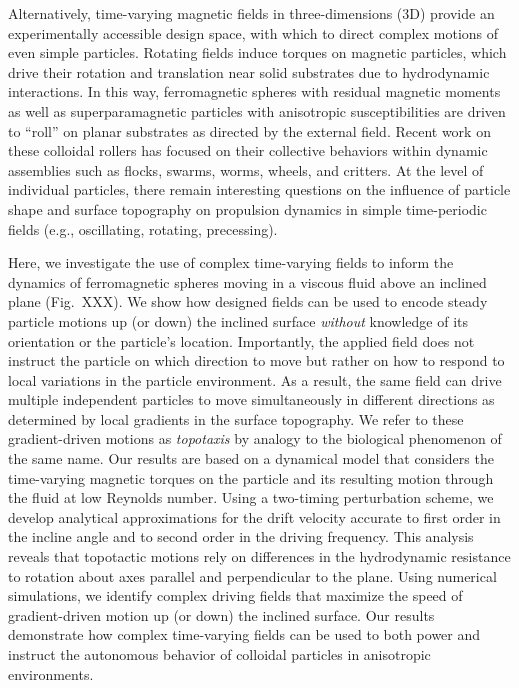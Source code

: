 Alternatively, time-varying magnetic fields in three-dimensions (3D) provide an experimentally accessible design space, with which to direct complex motions of even simple particles. Rotating fields induce torques on magnetic particles,\cite{Janssen2009} which drive their rotation and translation near solid substrates due to hydrodynamic interactions.\cite{Swan2007} In this way, ferromagnetic spheres with residual magnetic moments\cite{Driscoll2017} as well as superparamagnetic particles with anisotropic susceptibilities\cite{Tierno2008} are driven to “roll” on planar substrates as directed by the external field. Recent work on these colloidal rollers has focused on their collective behaviors within dynamic assemblies such as flocks,\cite{Kaiser2017} swarms,\cite{Xie2019} worms,\cite{Martinez-Pedrero2015} wheels,\cite{Tasci2016} and critters.\cite{Driscoll2017} At the level of individual particles, there remain interesting questions on the influence of particle shape\cite{Zhang2010} and surface topography\cite{Yang2019} on propulsion dynamics in simple time-periodic fields (e.g., oscillating, rotating, precessing).
 
Here, we investigate the use of complex time-varying fields to inform the dynamics of ferromagnetic spheres moving in a viscous fluid above an inclined plane (Fig.~XXX). We show how designed fields can be used to encode steady particle motions up (or down) the inclined surface \emph{without} knowledge of its orientation or the particle’s location. Importantly, the applied field does not instruct the particle on which direction to move but rather on how to respond to local variations in the particle environment. As a result, the same field can drive multiple independent particles to move simultaneously in different directions as determined by local gradients in the surface topography.  We refer to these gradient-driven motions as \emph{topotaxis} by analogy to the biological phenomenon of the same name.\cite{Park2018} Our results are based on a dynamical model that considers the time-varying magnetic torques on the particle and its resulting motion through the fluid at low Reynolds number. Using a two-timing perturbation scheme, we develop analytical approximations for the drift velocity accurate to first order in the incline angle and to second order in the driving frequency.   This analysis reveals that topotactic motions rely on differences in the hydrodynamic resistance to rotation about axes parallel and perpendicular to the plane. Using numerical simulations, we identify complex driving fields that maximize the speed of gradient-driven motion up (or down) the inclined surface.  Our results demonstrate how complex time-varying fields can be used to both power and instruct the autonomous behavior of colloidal particles in anisotropic environments.

